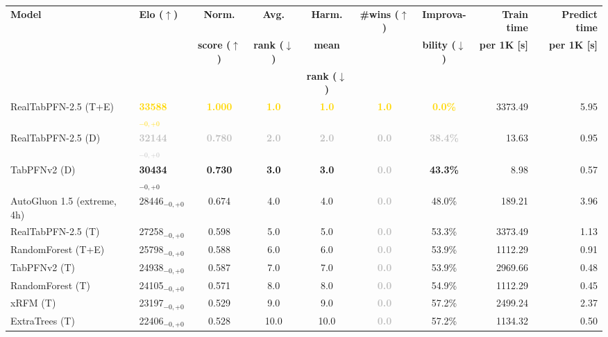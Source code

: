 \begin{tabular}{llcccccrr}
\toprule
\textbf{Model} & \textbf{Elo ($\uparrow$)} & \textbf{Norm.} & \textbf{Avg.} & \textbf{Harm.} & \textbf{\#wins ($\uparrow$)} & \textbf{Improva-} & \textbf{Train time} & \textbf{Predict time} \\
 &  & \textbf{score ($\uparrow$)} & \textbf{rank ($\downarrow$)} & \textbf{mean} &  & \textbf{bility ($\downarrow$)} & \textbf{per 1K [s]} & \textbf{per 1K [s]} \\
 &  &  &  & \textbf{rank ($\downarrow$)} &  &  &  &  \\
\midrule
RealTabPFN-2.5 (T+E) & \textcolor{gold}{\textbf{33588${}_{-0,+0}$}} & \textcolor{gold}{\textbf{1.000}} & \textcolor{gold}{\textbf{1.0}} & \textcolor{gold}{\textbf{1.0}} & \textcolor{gold}{\textbf{1.0}} & \textcolor{gold}{\textbf{0.0\%}} & 3373.49 & 5.95 \\
RealTabPFN-2.5 (D) & \textcolor{silver}{\textbf{32144${}_{-0,+0}$}} & \textcolor{silver}{\textbf{0.780}} & \textcolor{silver}{\textbf{2.0}} & \textcolor{silver}{\textbf{2.0}} & \textcolor{silver}{\textbf{0.0}} & \textcolor{silver}{\textbf{38.4\%}} & 13.63 & 0.95 \\
TabPFNv2 (D) & \textcolor{bronze}{\textbf{30434${}_{-0,+0}$}} & \textcolor{bronze}{\textbf{0.730}} & \textcolor{bronze}{\textbf{3.0}} & \textcolor{bronze}{\textbf{3.0}} & \textcolor{silver}{\textbf{0.0}} & \textcolor{bronze}{\textbf{43.3\%}} & 8.98 & 0.57 \\
AutoGluon 1.5 (extreme, 4h) & 28446${}_{-0,+0}$ & 0.674 & 4.0 & 4.0 & \textcolor{silver}{\textbf{0.0}} & 48.0\% & 189.21 & 3.96 \\
RealTabPFN-2.5 (T) & 27258${}_{-0,+0}$ & 0.598 & 5.0 & 5.0 & \textcolor{silver}{\textbf{0.0}} & 53.3\% & 3373.49 & 1.13 \\
RandomForest (T+E) & 25798${}_{-0,+0}$ & 0.588 & 6.0 & 6.0 & \textcolor{silver}{\textbf{0.0}} & 53.9\% & 1112.29 & 0.91 \\
TabPFNv2 (T) & 24938${}_{-0,+0}$ & 0.587 & 7.0 & 7.0 & \textcolor{silver}{\textbf{0.0}} & 53.9\% & 2969.66 & 0.48 \\
RandomForest (T) & 24105${}_{-0,+0}$ & 0.571 & 8.0 & 8.0 & \textcolor{silver}{\textbf{0.0}} & 54.9\% & 1112.29 & 0.45 \\
xRFM (T) & 23197${}_{-0,+0}$ & 0.529 & 9.0 & 9.0 & \textcolor{silver}{\textbf{0.0}} & 57.2\% & 2499.24 & 2.37 \\
ExtraTrees (T) & 22406${}_{-0,+0}$ & 0.528 & 10.0 & 10.0 & \textcolor{silver}{\textbf{0.0}} & 57.2\% & 1134.32 & 0.50 \\

\end{tabular}
